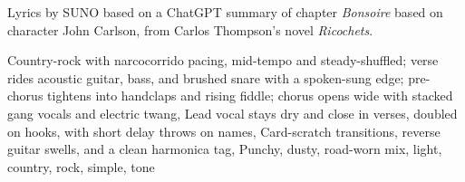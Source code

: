 
\begin{notes}
Lyrics by SUNO based on a ChatGPT summary of chapter \emph{Bonsoire} based on character John Carlson, from Carlos Thompson's novel \emph{Ricochets}.
\end{notes}
\begin{style}
Country-rock with narcocorrido pacing, mid-tempo and steady-shuffled; verse rides acoustic guitar, bass, and brushed snare with a spoken-sung edge; pre-chorus tightens into handclaps and rising fiddle; chorus opens wide with stacked gang vocals and electric twang, Lead vocal stays dry and close in verses, doubled on hooks, with short delay throws on names, Card-scratch transitions, reverse guitar swells, and a clean harmonica tag, Punchy, dusty, road-worn mix, light, country, rock, simple, tone
\end{style}

